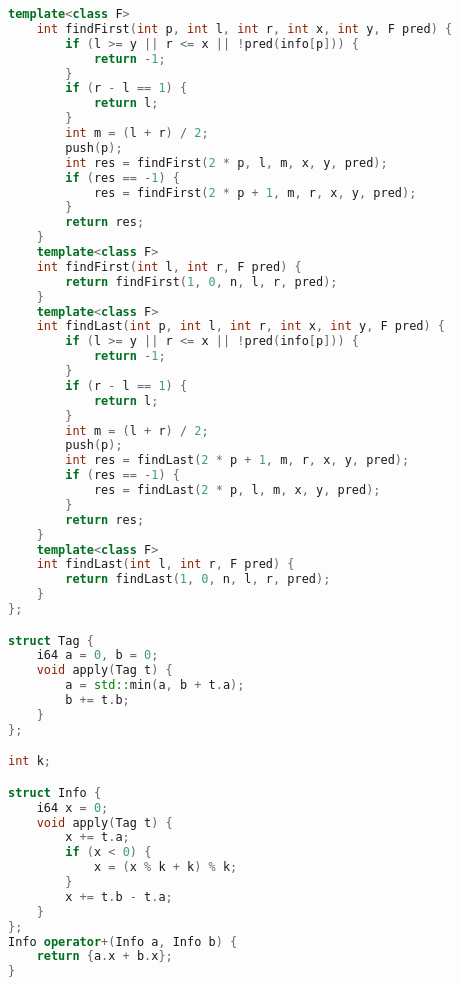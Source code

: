 \begin{lstlisting}[language=C++]
    template<class F>
    int findFirst(int p, int l, int r, int x, int y, F pred) {
        if (l >= y || r <= x || !pred(info[p])) {
            return -1;
        }
        if (r - l == 1) {
            return l;
        }
        int m = (l + r) / 2;
        push(p);
        int res = findFirst(2 * p, l, m, x, y, pred);
        if (res == -1) {
            res = findFirst(2 * p + 1, m, r, x, y, pred);
        }
        return res;
    }
    template<class F>
    int findFirst(int l, int r, F pred) {
        return findFirst(1, 0, n, l, r, pred);
    }
    template<class F>
    int findLast(int p, int l, int r, int x, int y, F pred) {
        if (l >= y || r <= x || !pred(info[p])) {
            return -1;
        }
        if (r - l == 1) {
            return l;
        }
        int m = (l + r) / 2;
        push(p);
        int res = findLast(2 * p + 1, m, r, x, y, pred);
        if (res == -1) {
            res = findLast(2 * p, l, m, x, y, pred);
        }
        return res;
    }
    template<class F>
    int findLast(int l, int r, F pred) {
        return findLast(1, 0, n, l, r, pred);
    }
};

struct Tag {
    i64 a = 0, b = 0;
    void apply(Tag t) {
        a = std::min(a, b + t.a);
        b += t.b;
    }
};

int k;

struct Info {
    i64 x = 0;
    void apply(Tag t) {
        x += t.a;
        if (x < 0) {
            x = (x % k + k) % k;
        }
        x += t.b - t.a;
    }
};
Info operator+(Info a, Info b) {
    return {a.x + b.x};
}

\end{lstlisting}

